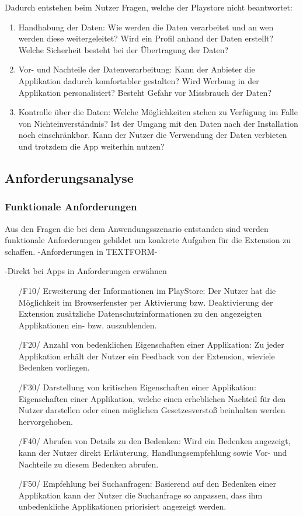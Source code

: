 Dadurch entstehen beim Nutzer Fragen, welche der Playstore nicht beantwortet:
 \begin{enumerate}
 	\item Handhabung der Daten: Wie werden die Daten verarbeitet und an wen werden diese weitergeleitet? Wird ein Profil anhand der Daten erstellt? Welche Sicherheit besteht bei der Übertragung der Daten?
 	\item Vor- und Nachteile der Datenverarbeitung: Kann der Anbieter die Applikation dadurch komfortabler gestalten? Wird Werbung in der Applikation personalisiert? Besteht Gefahr vor Missbrauch der Daten?
 	\item Kontrolle über die Daten: Welche Möglichkeiten stehen zu Verfügung im Falle von Nichteinverständnis? Ist der Umgang mit den Daten nach der Installation noch einschränkbar. Kann der Nutzer die Verwendung der Daten verbieten und trotzdem die App weiterhin nutzen?
 \end{enumerate}


\subsection{Anforderungsanalyse}
\label{ss:anforderungsanalyse}

\subsubsection{Funktionale Anforderungen}

Aus den Fragen die bei dem Anwendungsszenario entstanden sind werden funktionale Anforderungen gebildet um konkrete Aufgaben für die Extension zu schaffen. -Anforderungen in TEXTFORM-

-Direkt bei Apps in Anforderungen erwähnen
\begin{itemize}
	\item[/F10/] Erweiterung der Informationen im PlayStore:
	Der Nutzer hat die Möglichkeit im Browserfenster per Aktivierung bzw. Deaktivierung der Extension zusätzliche Datenschutzinformationen zu den angezeigten Applikationen ein- bzw. auszublenden.
	\item[/F20/] Anzahl von bedenklichen Eigenschaften einer Applikation:
	Zu jeder Applikation erhält der Nutzer ein Feedback von der Extension, wieviele Bedenken vorliegen.
	\item[/F30/] Darstellung von kritischen Eigenschaften einer Applikation:
	Eigenschaften einer Applikation, welche einen erheblichen Nachteil für den Nutzer darstellen oder einen möglichen Gesetzesverstoß beinhalten werden hervorgehoben.
	\item[/F40/] Abrufen von Details zu den Bedenken:
	Wird ein Bedenken angezeigt, kann der Nutzer direkt Erläuterung, Handlungsempfehlung sowie Vor- und Nachteile zu diesem Bedenken abrufen.
	\item[/F50/] Empfehlung bei Suchanfragen:
	Basierend auf den Bedenken einer Applikation kann der Nutzer die Suchanfrage so anpassen, dass ihm unbedenkliche Applikationen priorisiert angezeigt werden.
\end{itemize}

